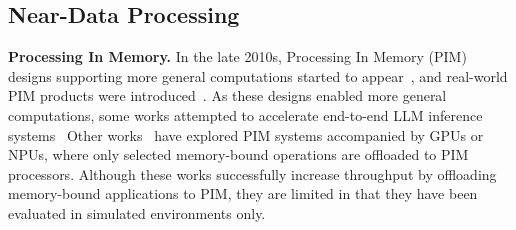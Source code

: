 \subsection{Near-Data Processing}


\textbf{Processing In Memory.}
In the late 2010s, Processing In Memory (PIM) designs supporting more general computations started to appear~\cite{newton, aim, hbmpim}, and real-world PIM products were introduced~\cite{upmem, hbmpim, aim}.
As these designs enabled more general computations, some works attempted to accelerate end-to-end LLM inference systems~\cite{transpim, pimdl}
Other works~\cite{neupims, attacc} have explored PIM systems accompanied by GPUs or NPUs, where only selected memory-bound operations are offloaded to PIM processors.
Although these works successfully increase throughput by offloading memory-bound applications to PIM, they are limited in that they have been evaluated in simulated environments only.


